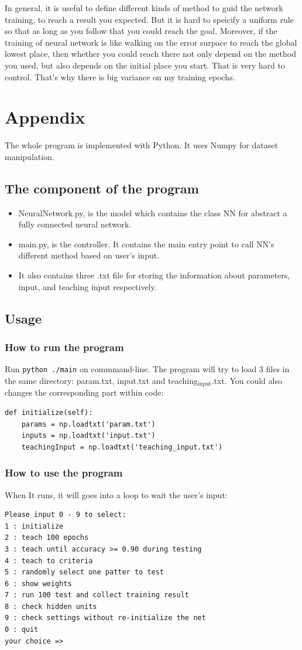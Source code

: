 \documentclass[11pt]{article}
\begin{document}
In general, it is useful to define different kinds of method to guid the network training, to reach a result you expected. But it is hard to speicify a uniform rule so that as long as you follow that you could reach the goal. Moreover, if the training of neural network is like walking on the error surpace to reach the global lowest place, then whether you could reach there not only depend on the method you used, but also depends on the initial place you start. That is very hard to control. That's why there is big variance on my training epochs.

\section{Appendix}
\label{sec-5}
The whole program is implemented with Python. It uses Numpy for dataset manipulation.
\subsection{The component of the program}
\label{sec-5-1}
\begin{itemize}
\item NeuralNetwork.py, is the model which contains the class NN for abstract a fully connected neural network.
\item main.py, is the controller. It contains the main entry point to call NN's different method based on user's input.
\item It also contains three .txt file for storing the information about parameters, input, and teaching input respectively.
\end{itemize}
\subsection{Usage}
\label{sec-5-2}
\subsubsection{How to run the program}
\label{sec-5-2-1}
Run \texttt{python ./main} on commmand-line.
The program will try to load 3 files in the same directory: param.txt, input.txt and teaching$_{\text{input}}$.txt. You could also changes the corresponding part within code:
\begin{verbatim}
def initialize(self):
    params = np.loadtxt('param.txt')
    inputs = np.loadtxt('input.txt')
    teachingInput = np.loadtxt('teaching_input.txt')
\end{verbatim}
\subsubsection{How to use the program}
\label{sec-5-2-2}
When It runs, it will goes into a loop to wait the user's input:
\begin{verbatim}
Please input 0 - 9 to select:
1 : initialize
2 : teach 100 epochs
3 : teach until accuracy >= 0.90 during testing
4 : teach to criteria
5 : randomly select one patter to test
6 : show weights
7 : run 100 test and collect training result
8 : check hidden units
9 : check settings without re-initialize the net
0 : quit
your choice =>
\end{verbatim}
\end{document}
